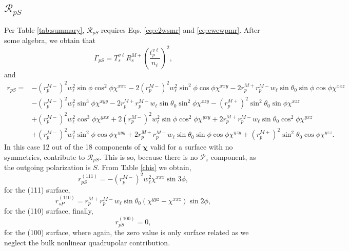 
\subsection{\texorpdfstring{$\mathcal{R}_{pS}$}{RpS}}\label{sec:RpS}

Per Table \ref{tab:summary}, $\mathcal{R}_{pS}$ requires Eqs. \eqref{eq:e2wsmr} and \eqref{eq:ewewpmr}. After some algebra, we obtain that
\begin{equation}\label{mcv}
\Gamma_{pS} =
T_{s}^{v\ell}R^{M+}_{s}
\left(\frac{t^{v\ell}_{p}}{n_{\ell}}\right)^{2},
\end{equation}
and
\begin{equation}
\begin{split}
r_{pS}=
&- \left(r^{M-}_{p}\right)^{2}w^{2}_{\ell}\sin\phi\cos^{2}\phi\chi^{xxx}
 - 2\left(r^{M-}_{p}\right)^{2}w^{2}_{\ell}\sin^{2}\phi\cos\phi\chi^{xxy}
 - 2r^{M+}_{p}r^{M-}_{p}w_{\ell}\sin\theta_{0}\sin\phi\cos\phi\chi^{xxz}\\
&- \left(r^{M-}_{p}\right)^{2}w^{2}_{\ell}\sin^{3}\phi\chi^{xyy}
 - 2r^{M+}_{p}r^{M-}_{p}w_{\ell}\sin\theta_{0}\sin^{2}\phi\chi^{xzy}
 - \left(r^{M+}_{p}\right)^{2}\sin^{2}\theta_{0}\sin\phi\chi^{xzz}\\
&+ \left(r^{M-}_{p}\right)^{2}w^{2}_{\ell}\cos^{3}\phi\chi^{yxx}
 + 2\left(r^{M-}_{p}\right)^{2}w^{2}_{\ell}\sin\phi\cos^{2}\phi\chi^{yxy}
 + 2r^{M+}_{p}r^{M-}_{p}w_{\ell}\sin\theta_{0}\cos^{2}\phi\chi^{yxz}\\
&+ \left(r^{M-}_{p}\right)^{2}w^{2}_{\ell}\sin^{2}\phi\cos\phi\chi^{yyy}
 + 2r^{M+}_{p}r^{M-}_{p}w_{\ell}\sin\theta_{0}\sin\phi\cos\phi\chi^{yzy}
 + \left(r^{M+}_{p}\right)^{2}\sin^{2}\theta_{0}\cos\phi\chi^{yzz}.
\end{split}
\end{equation}
In this case 12 out of the 18 components of $\boldsymbol{\chi}$ valid for a surface with no symmetries, contribute to $\mathcal{R}_{pS}$. This is so, because there is no $\mathcal{P}_{z}$ component, as the outgoing polarization is $S$. From Table \ref{chis} we obtain,
\begin{equation}\label{r111ps}
r^{(111)}_{pS} = - \left(r^{M-}_{p}\right)^{2}w^{2}_{\ell}\chi^{xxx}\sin3\phi,
\end{equation}
for the (111) surface,
\begin{equation}\label{r110ps}
r^{(110)}_{sP} =
r^{M+}_{p}r^{M-}_{p}w_{\ell}\sin\theta_{0}(\chi^{yyz} - \chi^{xxz})\sin2\phi,
\end{equation}
for the (110) surface, 
finally,
\begin{equation}\label{r100ps}
r^{(100)}_{pS} = 0,
\end{equation}
for the (100) surface, where again, the zero value is only surface related as we neglect  the bulk nonlinear quadrupolar contribution.

